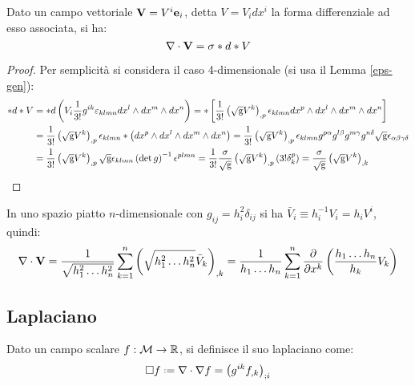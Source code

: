 \begin{proposition}
	Dato un campo vettoriale $ \mathbf{V} = V^i \mathbf{e}_i $, detta $ V = V_i dx^i $ la forma differenziale ad esso associata, si ha:
	\begin{equation}
		\nabla\cdot\mathbf{V} = \sigma * d * V
		\label{eq:4.24}
	\end{equation}
\end{proposition}
\begin{proof}
	Per semplicità si considera il caso 4-dimensionale (si usa il Lemma \ref{eps-gen}):
	\begin{equation*}
		\begin{split}
			*d*V
			&= *d \left( V_i \frac{1}{3!} g^{ik} \varepsilon_{klmn} dx^l \wedge dx^m \wedge dx^n \right) = * \left[ \frac{1}{3!} \left( \sqrt{\mathbf{\text{g}}} V^k \right)_{,p} \epsilon_{klmn} dx^p \wedge dx^l \wedge dx^m \wedge dx^n \right]\\
			&= \frac{1}{3!} \left( \sqrt{\mathbf{\text{g}}} V^k \right)_{,p} \epsilon_{klmn} *\left( dx^p \wedge dx^l \wedge dx^m \wedge dx^n \right) = \frac{1}{3!} \left( \sqrt{\mathbf{\text{g}}} V^k \right)_{,p} \epsilon_{klmn} g^{p \alpha} g^{l \beta} g^{m \gamma} g^{n \delta} \sqrt{\mathbf{\text{g}}} \epsilon_{\alpha \beta \gamma \delta}\\
			&= \frac{1}{3!} \left( \sqrt{\mathbf{\text{g}}} V^k \right)_{,p} \sqrt{\mathbf{\text{g}}} \epsilon_{klmn} \left( \det g \right)^{-1} \epsilon^{plmn} = \frac{1}{3!} \frac{\sigma}{\sqrt{\mathbf{\text{g}}}} \left( \sqrt{\mathbf{\text{g}}} V^k \right)_{,p} \left( 3! \delta^p_k \right) = \frac{\sigma}{\sqrt{\mathbf{\text{g}}}} \left( \sqrt{\mathbf{\text{g}}} V^k \right)_{,k}
		\end{split}
	\end{equation*}
\end{proof}

\begin{example}
	In uno spazio piatto $ n $-dimensionale con $ g_{ij} = h_i^2 \delta_{ij} $ si ha $ \bar{V}_i \equiv h_i^{-1} V_i = h_i V^i $, quindi:
	\begin{equation*}
		\nabla\cdot\mathbf{V} = \frac{1}{\sqrt{h_1^2 \dots h_n^2}} \sum_{k = 1}^{n} \left( \sqrt{h_1^2 \dots h_n^2} \bar{V}_k \right)_{,k} = \frac{1}{h_1 \dots h_n} \sum_{k = 1}^{n} \frac{\partial}{\partial x^k} \left( \frac{h_1 \dots h_n}{h_k} V_k \right)
	\end{equation*}
\end{example}

\subsection{Laplaciano}

\begin{definition}
	Dato un campo scalare $ f : \mathcal{M} \rightarrow \mathbb{R} $, si definisce il suo laplaciano come:
	\begin{equation}
		\Box f \defeq \nabla\cdot\nabla f = \left( g^{ik} f_{,k} \right)_{;i}
		\label{eq:4.25}
	\end{equation}
\end{definition}

